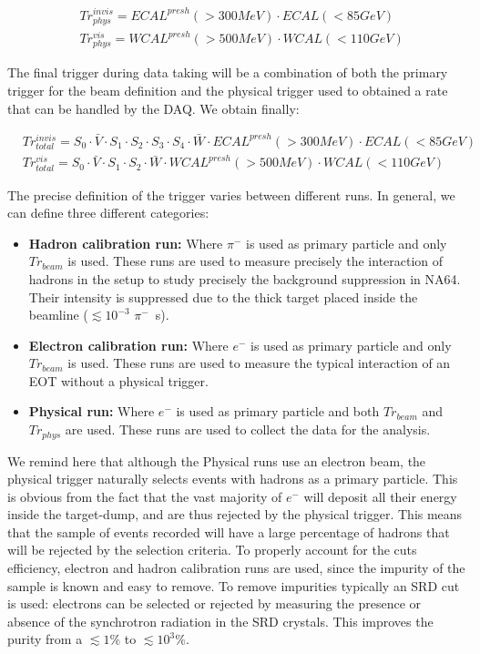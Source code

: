 \begin{equation}
\label{eq:trigger-phys}
\begin{split}
& Tr^{invis}_{phys} = ECAL^{presh}(>300 MeV) \cdot ECAL(<85 GeV)\\
& Tr^{vis}_{phys} = WCAL^{presh}(>500 MeV) \cdot WCAL(<110 GeV)
\end{split}
\end{equation}

The final trigger during data taking will be a combination of both the primary trigger for the beam definition and the physical trigger used to obtained a rate that can be handled by the DAQ. We obtain finally:

\begin{equation}
\label{eq:trigger-total}
\begin{split}
& Tr^{invis}_{total} = S_0 \cdot \bar{V} \cdot S_1 \cdot S_2 \cdot S_3 \cdot S_4 \cdot \bar{W} \cdot ECAL^{presh}(>300 MeV) \cdot ECAL(<85 GeV)\\
& Tr^{vis}_{total} = S_0 \cdot \bar{V} \cdot S_1 \cdot S_2\cdot \bar{W} \cdot WCAL^{presh}(>500 MeV) \cdot WCAL(<110 GeV)
\end{split}
\end{equation}

The precise definition of the trigger varies between different runs. In general, we can define three different categories:

\begin{itemize}
\item \textbf{Hadron calibration run:} Where $\pi^-$ is used as primary particle and only $Tr_{beam}$ is used. These runs are used to measure precisely the interaction of hadrons in the setup to study precisely the background suppression in NA64. Their intensity is suppressed due to the thick target placed inside the beamline ($\lesssim 10^{-3}$ $\pi^-$\si{\per\second}).
\item \textbf{Electron calibration run:} Where $e^-$ is used as primary particle and only $Tr_{beam}$ is used. These runs are used to measure the typical interaction of an EOT without a physical trigger. 
\item \textbf{Physical run:} Where $e^-$ is used as primary particle and both $Tr_{beam}$ and $Tr_{phys}$ are used. These runs are used to collect the data for the analysis. 
\end{itemize}

We remind here that although the Physical runs use an electron beam, the physical trigger naturally selects events with hadrons as a primary particle. This is obvious from the fact that the vast majority of $e^-$ will deposit all their energy inside the target-dump, and are thus rejected by the physical trigger. This means that the sample of events recorded will have a large percentage of hadrons that will be rejected by the selection criteria. To properly account for the cuts efficiency, electron and hadron calibration runs are used, since the impurity of the sample is known and easy to remove. To remove impurities typically an SRD cut is used: electrons can be selected or rejected by measuring the presence or absence of the synchrotron radiation in the SRD crystals. This improves the purity from a $\lesssim 1\%$ to $\lesssim 10^{3}\%$.

